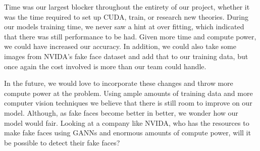 \documentclass[11pt, letterpaper]{article}
\begin{document}
\begin{multicols}{2}
  Time was our largest blocker throughout the entirety of our project, whether
  it was the time required to set up CUDA, train, or research new theories.
  During our models training time, we never saw a hint at over fitting, which
  indicated that there was still performance to be had. Given more time and
  compute power, we could have increased our accuracy. In addition, we could
  also take some images from NVIDA's fake face dataset and add that to our
  training data, but once again the cost involved is more than our team could
  handle. 
  
  In the future, we would love to incorporate these changes and throw more
  compute power at the problem. Using ample amounts of training data and more
  computer vision techniques we believe that there is still room to improve on
  our model. Although, as fake faces become better in better, we wonder how our
  model would fair. Looking at a company like NVIDA, who has the resources to
  make fake faces using GANNs and enormous amounts of compute power, will it be
  possible to detect their fake faces? 
  
\end{multicols}



\end{document}
